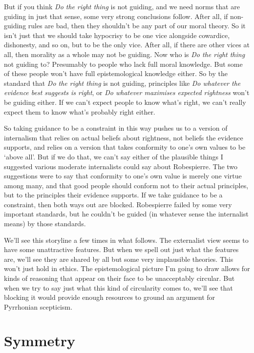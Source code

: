 But if you think \emph{Do the right thing} is not guiding, and we need norms that are guiding in just that sense, some very strong conclusions follow. After all, if non-guiding rules are bad, then they shouldn't be any part of our moral theory. So it isn't just that we should take hypocrisy to be one vice alongside cowardice, dishonesty, and so on, but to be the only vice. After all, if there are other vices at all, then morality as a whole may not be guiding. Now who is \emph{Do the right thing} not guiding to? Presumably to people who lack full moral knowledge. But some of these people won't have full epistemological knowledge either. So by the standard that \emph{Do the right thing} is not guiding, principles like \emph{Do whatever the evidence best suggests is right}, or \emph{Do whatever maximises expected rightness} won't be guiding either. If we can't expect people to know what's right, we can't really expect them to know what's probably right either.

So taking guidance to be a constraint in this way pushes us to a version of internalism that relies on actual beliefs about rightness, not beliefs the evidence supports, and relies on a version that takes conformity to one's own values to be `above all'. But if we do that, we can't say either of the plausible things I suggested various moderate internalists could say about \gls{Robespierre}. The two suggestions were to say that conformity to one's own value is merely one virtue among many, and that good people should conform not to their actual principles, but to the principles their evidence supports. If we take guidance to be a constraint, then both ways out are blocked. \gls{Robespierre} failed by some very important standards, but he couldn't be guided (in whatever sense the internalist means) by those standards.

We'll see this storyline a few times in what follows. The externalist view seems to have some unattractive features. But when we spell out just what the features are, we'll see they are shared by all but some very implausible theories. This won't just hold in ethics. The epistemological picture I'm going to draw allows for kinds of reasoning that appear on their face to be unacceptably circular. But when we try to say just what this kind of circularity comes to, we'll see that blocking it would provide enough resources to ground an argument for Pyrrhonian scepticism.

\section{Symmetry}
\label{symmetry}

